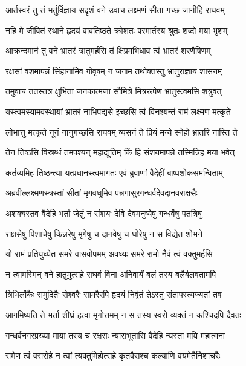 
\twolineshloka
{आर्तस्वरं तु तं भर्तुर्विज्ञाय सदृशं वने}
{उवाच लक्ष्मणं सीता गच्छ जानीहि राघवम्} %

\twolineshloka
{नहि मे जीवितं स्थाने हृदयं वावतिष्ठते}
{क्रोशतः परमार्तस्य श्रुतः शब्दो मया भृशम्} %

\twolineshloka
{आक्रन्दमानं तु वने भ्रातरं त्रातुमर्हसि}
{तं क्षिप्रमभिधाव त्वं भ्रातरं शरणैषिणम्} %

\twolineshloka
{रक्षसां वशमापन्नं सिंहानामिव गोवृषम्}
{न जगाम तथोक्तस्तु भ्रातुराज्ञाय शासनम्} %

\twolineshloka
{तमुवाच ततस्तत्र क्षुभिता जनकात्मजा}
{सौमित्रे मित्ररूपेण भ्रातुस्त्वमसि शत्रुवत्} %

\twolineshloka
{यस्त्वमस्यामवस्थायां भ्रातरं नाभिपद्यसे}
{इच्छसि त्वं विनश्यन्तं रामं लक्ष्मण मत्कृते} %

\twolineshloka
{लोभात्तु मत्कृते नूनं नानुगच्छसि राघवम्}
{व्यसनं ते प्रियं मन्ये स्नेहो भ्रातरि नास्ति ते} %

\twolineshloka
{तेन तिष्ठसि विस्रब्धं तमपश्यन् महाद्युतिम्}
{किं हि संशयमापन्ने तस्मिन्निह मया भवेत्} %

\twolineshloka
{कर्तव्यमिह तिष्ठन्त्या यत्प्रधानस्त्वमागतः}
{एवं ब्रुवाणां वैदेहीं बाष्पशोकसमन्विताम्} %

\twolineshloka
{अब्रवील्लक्ष्मणस्त्रस्तां सीतां मृगवधूमिव}
{पन्नगासुरगन्धर्वदेवदानवराक्षसैः} %

\twolineshloka
{अशक्यस्तव वैदेहि भर्ता जेतुं न संशयः}
{देवि देवमनुष्येषु गन्धर्वेषु पतत्रिषु} %

\twolineshloka
{राक्षसेषु पिशाचेषु किन्नरेषु मृगेषु च}
{दानवेषु च घोरेषु न स विद्येत शोभने} %

\twolineshloka
{यो रामं प्रतियुध्येत समरे वासवोपमम्}
{अवध्यः समरे रामो नैवं त्वं वक्तुमर्हसि} %

\twolineshloka
{न त्वामस्मिन् वने हातुमुत्सहे राघवं विना}
{अनिवार्यं बलं तस्य बलैर्बलवतामपि} %

\twolineshloka
{त्रिभिर्लोकैः समुदितैः सेश्वरैः सामरैरपि}
{हृदयं निर्वृतं तेऽस्तु संतापस्त्यज्यतां तव} %

\twolineshloka
{आगमिष्यति ते भर्ता शीघ्रं हत्वा मृगोत्तमम्}
{न स तस्य स्वरो व्यक्तं न कश्चिदपि दैवतः} %

\twolineshloka
{गन्धर्वनगरप्रख्या माया तस्य च रक्षसः}
{न्यासभूतासि वैदेहि न्यस्ता मयि महात्मना} %

\twolineshloka
{रामेण त्वं वरारोहे न त्वां त्यक्तुमिहोत्सहे}
{कृतवैराश्च कल्याणि वयमेतैर्निशाचरैः} %

